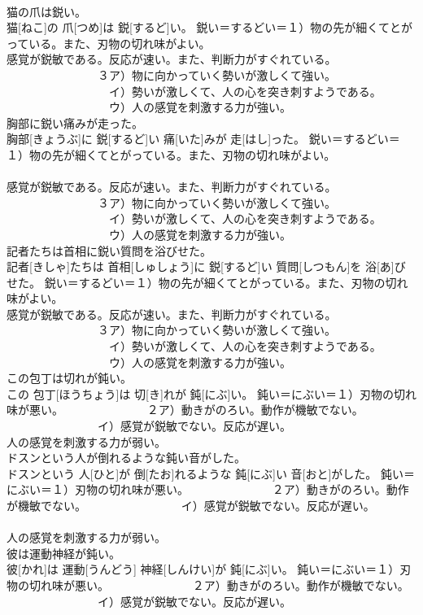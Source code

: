 \documentclass[8pt]{extreport}
\begin{document}
\begin{CJK}{UTF8}{min}
{\\	猫の爪は鋭い。	
\\	猫[ねこ]の 爪[つめ]は 鋭[するど]い。	鋭い＝するどい＝１）物の先が細くてとがっている。また、刃物の切れ味がよい。 　　　　　　　　
\\	感覚が鋭敏である。反応が速い。また、判断力がすぐれている。 　　　　　　　　３ア）物に向かっていく勢いが激しくて強い。 　　　　　　　　　イ）勢いが激しくて、人の心を突き刺すようである。 　　　　　　　　　ウ）人の感覚を刺激する力が強い。
\\	胸部に鋭い痛みが走った。	
\\	胸部[きょうぶ]に 鋭[するど]い 痛[いた]みが 走[はし]った。	鋭い＝するどい＝１）物の先が細くてとがっている。また、刃物の切れ味がよい。 　　　　　　　　
\\	感覚が鋭敏である。反応が速い。また、判断力がすぐれている。 　　　　　　　　３ア）物に向かっていく勢いが激しくて強い。 　　　　　　　　　イ）勢いが激しくて、人の心を突き刺すようである。 　　　　　　　　　ウ）人の感覚を刺激する力が強い。
\\	記者たちは首相に鋭い質問を浴びせた。	
\\	記者[きしゃ]たちは 首相[しゅしょう]に 鋭[するど]い 質問[しつもん]を 浴[あ]びせた。	鋭い＝するどい＝１）物の先が細くてとがっている。また、刃物の切れ味がよい。 　　　　　　　　
\\	感覚が鋭敏である。反応が速い。また、判断力がすぐれている。 　　　　　　　　３ア）物に向かっていく勢いが激しくて強い。 　　　　　　　　　イ）勢いが激しくて、人の心を突き刺すようである。 　　　　　　　　　ウ）人の感覚を刺激する力が強い。
\\	この包丁は切れが鈍い。	
\\	この 包丁[ほうちょう]は 切[き]れが 鈍[にぶ]い。	鈍い＝にぶい＝１）刃物の切れ味が悪い。 　　　　　　　２ア）動きがのろい。動作が機敏でない。 　　　　　　　　イ）感覚が鋭敏でない。反応が遅い。 　　　　　　　
\\	人の感覚を刺激する力が弱い。
\\	ドスンという人が倒れるような鈍い音がした。	
\\	ドスンという 人[ひと]が 倒[たお]れるような 鈍[にぶ]い 音[おと]がした。	鈍い＝にぶい＝１）刃物の切れ味が悪い。 　　　　　　　２ア）動きがのろい。動作が機敏でない。 　　　　　　　　イ）感覚が鋭敏でない。反応が遅い。 　　　　　　　
\\	人の感覚を刺激する力が弱い。
\\	彼は運動神経が鈍い。	
\\	彼[かれ]は 運動[うんどう] 神経[しんけい]が 鈍[にぶ]い。	鈍い＝にぶい＝１）刃物の切れ味が悪い。 　　　　　　　２ア）動きがのろい。動作が機敏でない。 　　　　　　　　イ）感覚が鋭敏でない。反応が遅い。 　　　　　　　
}
\end{CJK}
\end{document}
